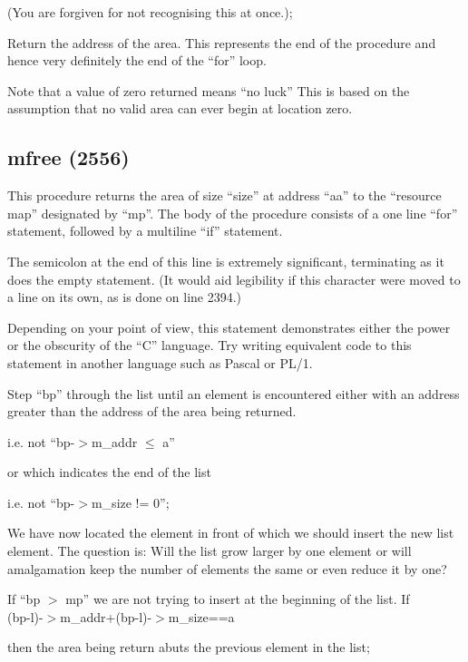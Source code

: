 (You are forgiven for not
recognising this at once.);


\item[2543:] Return the address of the area.
 This represents the end of the
 procedure and hence very definitely the end of the ``for'' loop.

Note that a value of zero
returned means ``no luck'' This is
based on the assumption that no
valid area can ever begin at
location zero.
\ed

\subsection{mfree (2556)}

This procedure returns the area of size
``size'' at address ``aa'' to the ``resource map''
designated by ``mp''. The body of
the procedure consists of a one line
``for'' statement, followed by a multiline ``if'' statement.

\bd
\item[2564:] The semicolon at the end of this
 line is extremely significant,
 terminating as it does the empty
 statement. (It would aid legibility if this character were moved
 to a line on its own, as is done
 on line 2394.)

Depending on your point of view,
this statement demonstrates
either the power or the obscurity
of the ``C'' language. Try writing
equivalent code to this statement
in another language such as Pascal or PL/1.

Step ``bp'' through the list until
an element is encountered either
with an address greater than the
address of the area being
returned.

 i.e. not ``bp-$>$m\_addr $\le$ a''

\noindent or which indicates the end of the list

 i.e. not ``bp-$>$m\_size != 0'';


\item[2565:] We have now located the element
 in front of which we should
 insert the new list element. The
 question is: Will the list grow
 larger by one element or will
 amalgamation keep the number of
 elements the same or even reduce
 it by one?

If ``bp $>$ mp'' we are not trying to
insert at the beginning of the
list. If\\
(bp-l)-$>$m\_addr+(bp-l)-$>$m\_size==a

\noindent then the area being return abuts
the previous element in the list;

